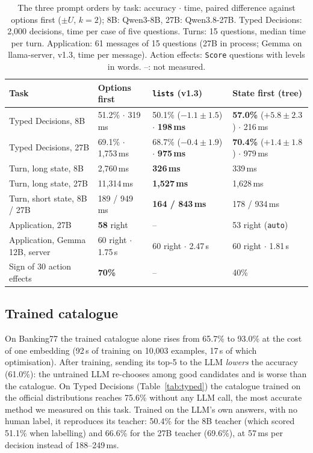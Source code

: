 \documentclass[11pt]{article}
\newcommand{\ms}{\,ms}
\begin{document}
\begin{table}[t]
\centering\small
\caption{The three prompt orders by task: accuracy $\cdot$ time, paired difference against options first ($\pm U$,
$k=2$); 8B: Qwen3-8B, 27B: Qwen3.8-27B. Typed Decisions: 2{,}000 decisions, time per case of five questions.
Turns: 15 questions, median time per turn.
Application: 61 messages of 15 questions (27B in process; Gemma on llama-server, v1.3, time per message). Action effects: \texttt{Score} questions with levels in words. --: not
measured.}\label{tab:task}
\footnotesize\setlength{\tabcolsep}{3pt}
\begin{tabular}{llll}
\toprule
Task & Options first & \texttt{lists} (v1.3) & State first (tree) \\
\midrule
Typed Decisions, 8B & 51.2\% $\cdot$ 319\ms & 50.1\% ($-1.1\pm1.5$) $\cdot$ \textbf{198\ms} & \textbf{57.0\%} ($+5.8\pm2.3$) $\cdot$ 216\ms \\
Typed Decisions, 27B & 69.1\% $\cdot$ 1{,}753\ms & 68.7\% ($-0.4\pm1.9$) $\cdot$ \textbf{975\ms} & \textbf{70.4\%} ($+1.4\pm1.8$) $\cdot$ 979\ms \\
Turn, long state, 8B & 2{,}760\ms & \textbf{326\ms} & 339\ms \\
Turn, long state, 27B & 11{,}314\ms & \textbf{1{,}527\ms} & 1{,}628\ms \\
Turn, short state, 8B / 27B & 189 / 949\ms & \textbf{164 / 843\ms} & 178 / 934\ms \\
Application, 27B &\textbf{58} right & -- & 53 right (\texttt{auto}) \\
Application, Gemma 12B, server & 60 right $\cdot$ 1.75\,s & 60 right $\cdot$ 2.47\,s & 60 right $\cdot$ 1.81\,s \\
Sign of 30 action effects & \textbf{70\%} & -- & 40\% \\
\bottomrule
\end{tabular}
\end{table}

\subsection{Trained catalogue}
On Banking77 the trained catalogue alone rises from 65.7\% to 93.0\% at the cost of one embedding (92\,s of training
on 10{,}003 examples, 17\,s of which optimisation). After training, sending its top-5 to the LLM \emph{lowers} the
accuracy (61.0\%): the untrained LLM re-chooses among good candidates and is worse than the catalogue. On Typed
Decisions (Table~\ref{tab:typed}) the catalogue trained on the official distributions reaches 75.6\% without any LLM
call, the most accurate method we measured on this task. Trained on the LLM's own answers, with no human label, it
reproduces its teacher: 50.4\% for the 8B teacher (which scored 51.1\% when labelling) and 66.6\% for the 27B
teacher (69.6\%), at 57\ms{} per decision instead of 188--249\ms.
\end{document}
